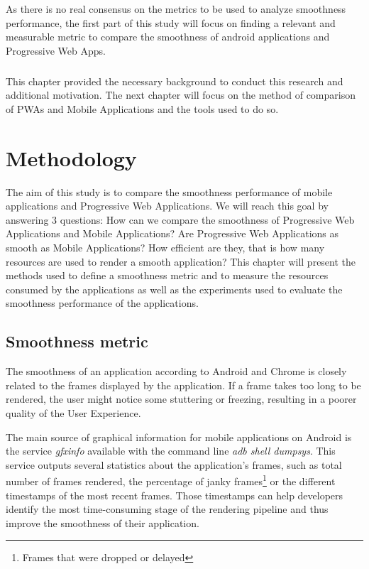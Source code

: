 \documentclass{kththesis}
\begin{document}
As there is no real consensus on the metrics to be used to analyze smoothness performance,  the first part of this study will focus on finding a relevant and measurable metric to compare the smoothness of android applications and Progressive Web Apps.

\paragraph{}
This chapter provided the necessary background to conduct this research and additional motivation. The next chapter will focus on the method of comparison of PWAs and Mobile Applications and the tools used to do so.
    

\chapter{Methodology}

The aim of this study is to compare the smoothness performance of mobile applications and Progressive Web Applications. We will reach this goal by answering 3 questions: How can we compare the smoothness of Progressive Web Applications and Mobile Applications? Are Progressive Web Applications as smooth as Mobile Applications? How efficient are they, that is how many resources are used to render a smooth application? \newline
This chapter will present the methods used to define a smoothness metric and to measure the resources consumed by the applications as well as the experiments used to evaluate the smoothness performance of the applications.


\section{Smoothness metric}
\label{method:smoothness}
    
    The smoothness of an application according to Android and Chrome is closely related to the frames displayed by the application. If a frame takes too long to be rendered, the user might notice some stuttering or freezing, resulting in a poorer quality of the User Experience. 
        
    The main source of graphical information for mobile applications on Android is the service \textit{gfxinfo} available with the command line \textit{adb shell dumpsys}. This service outputs several statistics about the application's frames, such as total number of frames rendered, the percentage of janky frames\footnote{Frames that were dropped or delayed} or the different timestamps of the most recent frames. Those timestamps can help developers identify the most time-consuming stage of the rendering pipeline and thus improve the smoothness of their application.
    
\end{document}
